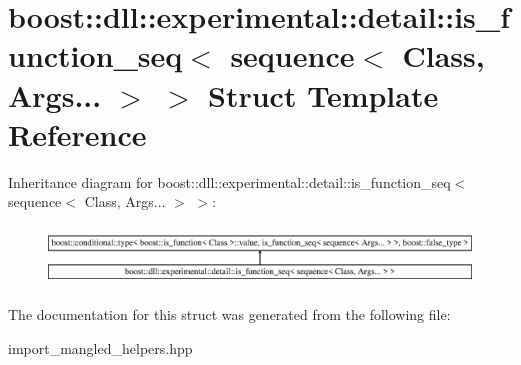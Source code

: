 \hypertarget{a01452}{}\section{boost\+:\+:dll\+:\+:experimental\+:\+:detail\+:\+:is\+\_\+function\+\_\+seq$<$ sequence$<$ Class, Args... $>$ $>$ Struct Template Reference}
\label{a01452}
Inheritance diagram for boost\+:\+:dll\+:\+:experimental\+:\+:detail\+:\+:is\+\_\+function\+\_\+seq$<$ sequence$<$ Class, Args... $>$ $>$\+:\begin{figure}[H]
\begin{center}
\leavevmode
\includegraphics[height=1.600000cm]{a01452}
\end{center}
\end{figure}


The documentation for this struct was generated from the following file\+:\begin{DoxyCompactItemize}
\item 
import\+\_\+mangled\+\_\+helpers.\+hpp\end{DoxyCompactItemize}
